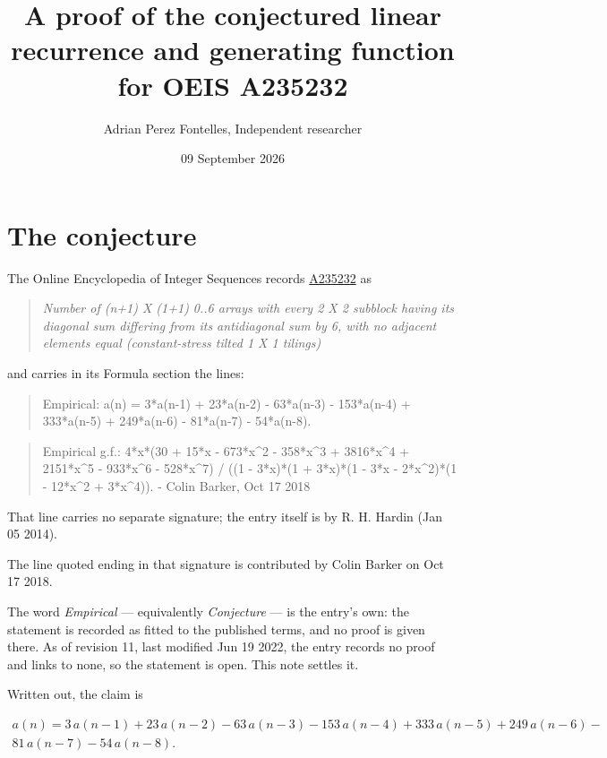 \documentclass[11pt]{article}
\title{A proof of the conjectured linear recurrence and generating function for OEIS A235232}
\author{Adrian Perez Fontelles, Independent researcher}
\date{09 September 2026}
\theoremstyle{definition}
\begin{document}
\maketitle
\section{The conjecture}

The Online Encyclopedia of Integer Sequences records \href{https://oeis.org/A235232}{A235232} as

\begin{quote}\itshape Number of (n+1) X (1+1) 0..6 arrays with every 2 X 2 subblock having its diagonal sum differing from its antidiagonal sum by 6, with no adjacent elements equal (constant-stress tilted 1 X 1 tilings)\end{quote}

and carries in its Formula section the lines:

\begin{quote}\ttfamily Empirical: a(n) = 3*a(n-1) + 23*a(n-2) - 63*a(n-3) - 153*a(n-4) + 333*a(n-5) + 249*a(n-6) - 81*a(n-7) - 54*a(n-8).\end{quote}

\begin{quote}\ttfamily Empirical g.f.: 4*x*(30 + 15*x - 673*x\textasciicircum{}2 - 358*x\textasciicircum{}3 + 3816*x\textasciicircum{}4 + 2151*x\textasciicircum{}5 - 933*x\textasciicircum{}6 - 528*x\textasciicircum{}7) / ((1 - 3*x)*(1 + 3*x)*(1 - 3*x - 2*x\textasciicircum{}2)*(1 - 12*x\textasciicircum{}2 + 3*x\textasciicircum{}4)). - Colin Barker, Oct 17 2018\end{quote}

That line carries no separate signature; the entry itself is by R. H. Hardin (Jan 05 2014).

The line quoted ending in that signature is contributed by Colin Barker on Oct 17 2018.

The word {\itshape Empirical} --- equivalently {\itshape Conjecture} --- is the entry's own: the statement is recorded as fitted to the published terms, and no proof is given there. As of revision 11, last modified Jun 19 2022, the entry records no proof and links to none, so the statement is open. This note settles it.

Written out, the claim is

\begin{multline*} a(n) = 3\,a(n-1) + 23\,a(n-2) - 63\,a(n-3) - 153\,a(n-4) + 333\,a(n-5) + 249\,a(n-6) - \\ 81\,a(n-7) - 54\,a(n-8). \end{multline*}
\end{document}

